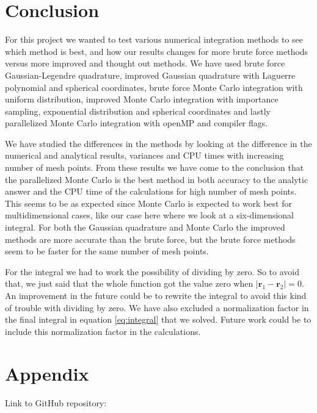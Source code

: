 \documentclass[12pt,a4paper,english]{article}
\begin{document}
\section{Conclusion}
For this project we wanted to test various numerical integration methods to see which method is best, and how our results changes for more brute force methods versus more improved and thought out methods. We have used brute force Gaussian-Legendre quadrature, improved Gaussian quadrature with Laguerre polynomial and spherical coordinates, brute force Monte Carlo integration with uniform distribution, improved Monte Carlo integration with importance sampling, exponential distribution and spherical coordinates and lastly parallelized Monte Carlo integration with openMP and compiler flags.

We have studied the differences in the methods by looking at the difference in the numerical and analytical results, variances and CPU times with increasing number of mesh points. From these results we have come to the conclusion that the parallelized Monte Carlo is the best method in both accuracy to the analytic answer and the CPU time of the calculations for high number of mesh points. This seems to be as expected since Monte Carlo is expected to work best for multidimensional cases, like our case here where we look at a six-dimensional integral. For both the Gaussian quadrature and Monte Carlo the improved methods are more accurate than the brute force, but the brute force methods seem to be faster for the same number of mesh points. 

For the integral we had to work the possibility of dividing by zero. So to avoid that, we just said that the whole function got the value zero when $|\textbf{r}_1-\textbf{r}_2|=0$. An improvement in the future could be to rewrite the integral to avoid this kind of trouble with dividing by zero. We have also excluded a normalization factor in the final integral in equation \ref{eq:integral} that we solved. Future work could be to include this normalization factor in the calculations.

\appendix
\section{Appendix}
\label{sect:appendix}
Link to GitHub repository:\\
\end{document}
